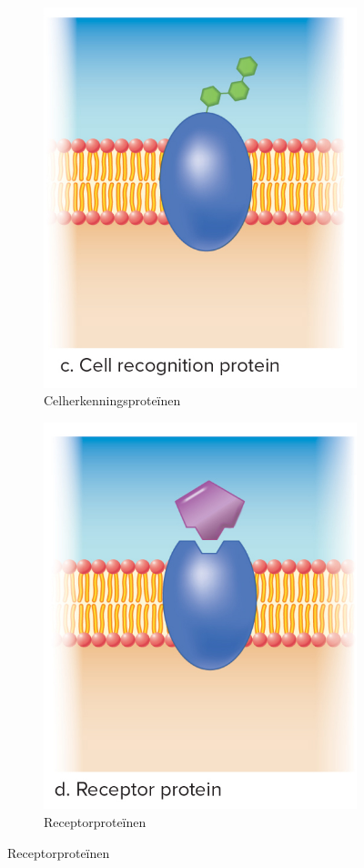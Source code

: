 \documentclass[a4paper,kul]{kulakarticle} %
\begin{document}
\begin{figure}[!htbp]
\medskip
	\begin{subfigure}{.5\textwidth}
		\centering
		\includegraphics[width=0.7\linewidth]{Celherkenningsprot}
		\caption{Celherkenningsproteïnen}
		\label{fig:Celherkenningsproteïnen}
	\end{subfigure}%
	\begin{subfigure}{.5\textwidth}
		\centering
		\includegraphics[width=0.7\linewidth]{Receptorprot}
		\caption{Receptorproteïnen}
		\label{fig:Receptorproteïnen}
	\end{subfigure}

\end{figure}
\end{document}
